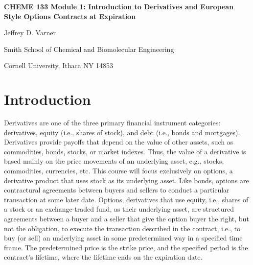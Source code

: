 \documentclass[11pt]{article}
\theoremstyle{definition}
\begin{document}
{\par\centering\textbf{\Large CHEME 133 Module 1: Introduction to Derivatives and European Style Options Contracts at Expiration}}
\vspace{0.2in}
{\par \centering \large{Jeffrey D. Varner}}
\vspace{0.05in}
{\par \centering \large{Smith School of Chemical and Biomolecular Engineering}}
{\par \centering \large{Cornell University, Ithaca NY 14853}}

\date{}
\thispagestyle{empty}

\setcounter{page}{1}

\section*{Introduction}
Derivatives are one of the three primary financial instrument categories: derivatives, equity (i.e., shares of stock), and debt (i.e., bonds and mortgages). 
Derivatives provide payoffs that depend on the value of other assets, such as commodities, bonds, stocks, or market indexes. 
Thus, the value of a derivative is based mainly on the price movements of an underlying asset, e.g., stocks, commodities, currencies, etc. 
This course will focus exclusively on options, a derivative product that uses stock as its underlying asset. 
Like bonds, options are contractural agreements between buyers and sellers to conduct a particular transaction at some later date. 
Options, derivatives that use equity, i.e., shares of a stock or an exchange-traded fund, as their underlying asset, 
are structured agreements between a buyer and a seller that give the option buyer the right, but not the obligation, 
to execute the transaction described in the contract, i.e., to buy (or sell) an underlying asset in some predetermined way in a specified time frame. 
The predetermined price is the strike price, and the specified period is the contract's lifetime, where the lifetime ends on the expiration date. 
\end{document}
